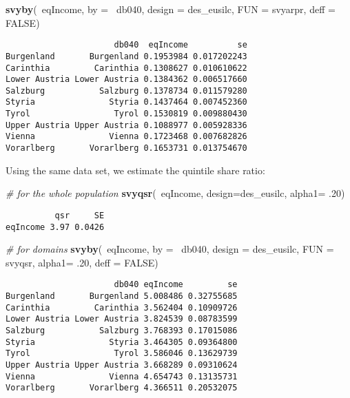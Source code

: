 \documentclass[]{book}
\newenvironment{Shaded}{\begin{snugshade}}{\end{snugshade}}
\newcommand{\KeywordTok}[1]{\textcolor[rgb]{0.13,0.29,0.53}{\textbf{{#1}}}}
\newcommand{\DataTypeTok}[1]{\textcolor[rgb]{0.13,0.29,0.53}{{#1}}}
\newcommand{\DecValTok}[1]{\textcolor[rgb]{0.00,0.00,0.81}{{#1}}}
\newcommand{\CommentTok}[1]{\textcolor[rgb]{0.56,0.35,0.01}{\textit{{#1}}}}
\newcommand{\OtherTok}[1]{\textcolor[rgb]{0.56,0.35,0.01}{{#1}}}
\newcommand{\NormalTok}[1]{{#1}}
\begin{document}
\begin{Shaded}
\begin{Highlighting}[]
\KeywordTok{svyby}\NormalTok{(~eqIncome, }\DataTypeTok{by =} \NormalTok{~db040, }\DataTypeTok{design =} \NormalTok{des_eusilc, }\DataTypeTok{FUN =} \NormalTok{svyarpr, }\DataTypeTok{deff =} \OtherTok{FALSE}\NormalTok{)}
\end{Highlighting}
\end{Shaded}

\begin{verbatim}
                      db040  eqIncome          se
Burgenland       Burgenland 0.1953984 0.017202243
Carinthia         Carinthia 0.1308627 0.010610622
Lower Austria Lower Austria 0.1384362 0.006517660
Salzburg           Salzburg 0.1378734 0.011579280
Styria               Styria 0.1437464 0.007452360
Tyrol                 Tyrol 0.1530819 0.009880430
Upper Austria Upper Austria 0.1088977 0.005928336
Vienna               Vienna 0.1723468 0.007682826
Vorarlberg       Vorarlberg 0.1653731 0.013754670
\end{verbatim}

Using the same data set, we estimate the quintile share ratio:

\begin{Shaded}
\begin{Highlighting}[]
\CommentTok{# for the whole population}
\KeywordTok{svyqsr}\NormalTok{(~eqIncome, }\DataTypeTok{design=}\NormalTok{des_eusilc, }\DataTypeTok{alpha1=} \NormalTok{.}\DecValTok{20}\NormalTok{)}
\end{Highlighting}
\end{Shaded}

\begin{verbatim}
          qsr     SE
eqIncome 3.97 0.0426
\end{verbatim}

\begin{Shaded}
\begin{Highlighting}[]
\CommentTok{# for domains}
\KeywordTok{svyby}\NormalTok{(~eqIncome, }\DataTypeTok{by =} \NormalTok{~db040, }\DataTypeTok{design =} \NormalTok{des_eusilc,}
  \DataTypeTok{FUN =} \NormalTok{svyqsr, }\DataTypeTok{alpha1=} \NormalTok{.}\DecValTok{20}\NormalTok{, }\DataTypeTok{deff =} \OtherTok{FALSE}\NormalTok{)}
\end{Highlighting}
\end{Shaded}

\begin{verbatim}
                      db040 eqIncome         se
Burgenland       Burgenland 5.008486 0.32755685
Carinthia         Carinthia 3.562404 0.10909726
Lower Austria Lower Austria 3.824539 0.08783599
Salzburg           Salzburg 3.768393 0.17015086
Styria               Styria 3.464305 0.09364800
Tyrol                 Tyrol 3.586046 0.13629739
Upper Austria Upper Austria 3.668289 0.09310624
Vienna               Vienna 4.654743 0.13135731
Vorarlberg       Vorarlberg 4.366511 0.20532075
\end{verbatim}
\end{document}
